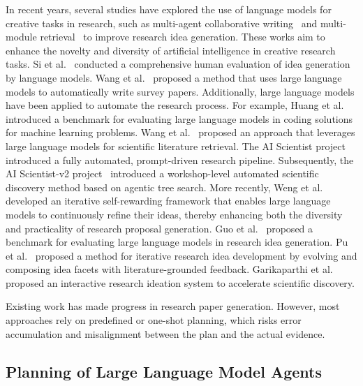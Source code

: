 \documentclass[manuscript,review,anonymous]{acmart}
\begin{document}
In recent years, several studies have explored the use of language models for creative tasks in research, such as multi-agent collaborative writing~\cite{baek2025researchagent} and multi-module retrieval~\cite{yang2024large} to improve research idea generation. These works aim to enhance the novelty and diversity of artificial intelligence in creative research tasks. Si et al.~\cite{si2024can} conducted a comprehensive human evaluation of idea generation by language models. Wang et al.~\cite{wang2024autosurvey} proposed a method that uses large language models to automatically write survey papers. Additionally, large language models have been applied to automate the research process. For example, Huang et al.~\cite{huang2024mlagentbench} introduced a benchmark for evaluating large language models in coding solutions for machine learning problems. Wang et al.~\cite{wang2023scimon} proposed an approach that leverages large language models for scientific literature retrieval. The AI Scientist project~\cite{lu2024ai} introduced a fully automated, prompt-driven research pipeline. Subsequently, the AI Scientist-v2 project~\cite{yamada2025ai} introduced a workshop-level automated scientific discovery method based on agentic tree search. More recently, Weng et al.~\cite{weng2025cycleresearcher} developed an iterative self-rewarding framework that enables large language models to continuously refine their ideas, thereby enhancing both the diversity and practicality of research proposal generation. Guo et al.~\cite{guo2025ideabench} proposed a benchmark for evaluating large language models in research idea generation. Pu et al.~\cite{pu2025ideasynth} proposed a method for iterative research idea development by evolving and composing idea facets with literature-grounded feedback. Garikaparthi et al.~\cite{garikaparthi2025iris} proposed an interactive research ideation system to accelerate scientific discovery.

Existing work has made progress in research paper generation. However, most approaches rely on predefined or one-shot planning, which risks error accumulation and misalignment between the plan and the actual evidence.

\subsection{Planning of Large Language Model Agents}
\end{document}

